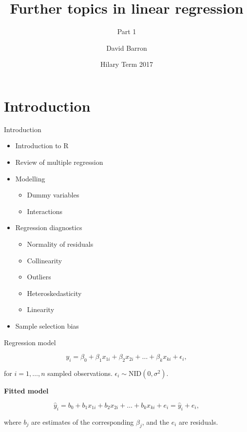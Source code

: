 \documentclass[10pt,ignorenonframetext,]{beamer}
\title{Further topics in linear regression}
\subtitle{Part 1}
\author{David Barron}
\date{Hilary Term 2017}
\providecommand{\tightlist}{%
\setlength{\itemsep}{0pt}\setlength{\parskip}{0pt}}
\begin{document}
\frame{\titlepage}

\begin{frame}
\tableofcontents[hideallsubsections]
\end{frame}

\section{Introduction}\label{introduction}

\begin{frame}{Introduction}

\begin{itemize}
\tightlist
\item
  Introduction to R
\item
  Review of multiple regression
\item
  Modelling

  \begin{itemize}
  \tightlist
  \item
    Dummy variables
  \item
    Interactions
  \end{itemize}
\item
  Regression diagnostics

  \begin{itemize}
  \tightlist
  \item
    Normality of residuals
  \item
    Collinearity
  \item
    Outliers
  \item
    Heteroskedasticity
  \item
    Linearity
  \end{itemize}
\item
  Sample selection bias
\end{itemize}

\end{frame}

\begin{frame}{Regression model}

\[
y_i = \beta_0 + \beta_1 x_{1i} + \beta_2 x_{2i}+\dots+\beta_k x_{ki}
+ \epsilon_i,
\]

for \(i=1,\dots,n\) sampled observations.
\(\epsilon_i\sim \text{NID}(0,\sigma^2)\).

\textbf{Fitted model}

\[
\hat{y}_i = b_0 + b_1 x_{1i} + b_2 x_{2i} + \dots + b_k x_{ki}
+ e_i = \hat{y}_i + e_i,
\]

where \(b_j\) are estimates of the corresponding \(\beta_j\), and the
\(e_i\) are residuals.

\end{frame}
\end{document}
